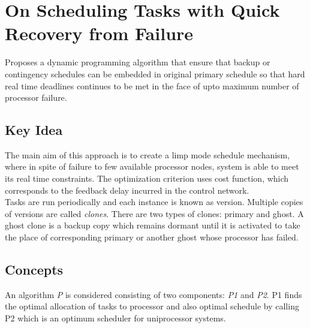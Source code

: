 \section{On Scheduling Tasks with Quick Recovery from Failure}
Proposes a dynamic programming algorithm that ensure that backup or contingency schedules can be embedded in original primary schedule so that hard real time deadlines continues to be met in the face of upto maximum number of processor failure.
\subsection*{Key Idea}
The main aim of this approach is to create a limp mode schedule mechanism, where in spite of failure to few available processor nodes, system is able to meet its real time constraints.
The optimization criterion uses cost function, which corresponds to the feedback delay incurred in the control network. \\
Tasks are run periodically and each instance is known as version. 
Multiple copies of versions are called \textit{clones}. There are two types of clones: primary and ghost. A ghost clone is a backup copy which remains dormant until it is activated to take the place of corresponding primary or another ghost whose processor has failed.
\subsection*{Concepts}
An algorithm \textit{P} is considered consisting of two components: \textit{P1} and \textit{P2}.
P1 finds the optimal allocation of tasks to processor and also optimal schedule by calling P2 which is an optimum scheduler for uniprocessor systems.
